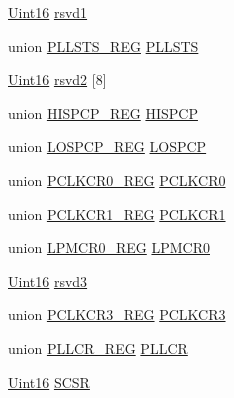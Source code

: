 \begin{DoxyCompactItemize}
\item 
\hyperlink{_d_s_p2833x___device_8h_a59a9f6be4562c327cbfb4f7e8e18f08b}{Uint16} \hyperlink{struct_s_y_s___c_t_r_l___r_e_g_s_a92fe15d379e0656fa835523dbca62358}{rsvd1}
\item 
union \hyperlink{union_p_l_l_s_t_s___r_e_g}{P\+L\+L\+S\+T\+S\+\_\+\+R\+E\+G} \hyperlink{struct_s_y_s___c_t_r_l___r_e_g_s_a13b1bddad30d3266f4160bc1fd0de68a}{P\+L\+L\+S\+T\+S}
\item 
\hyperlink{_d_s_p2833x___device_8h_a59a9f6be4562c327cbfb4f7e8e18f08b}{Uint16} \hyperlink{struct_s_y_s___c_t_r_l___r_e_g_s_aa20216c5f26c9dc412222a9b274747c0}{rsvd2} \mbox{[}8\mbox{]}
\item 
union \hyperlink{union_h_i_s_p_c_p___r_e_g}{H\+I\+S\+P\+C\+P\+\_\+\+R\+E\+G} \hyperlink{struct_s_y_s___c_t_r_l___r_e_g_s_ad42d708dd4d801d6e2d4e500f40203c1}{H\+I\+S\+P\+C\+P}
\item 
union \hyperlink{union_l_o_s_p_c_p___r_e_g}{L\+O\+S\+P\+C\+P\+\_\+\+R\+E\+G} \hyperlink{struct_s_y_s___c_t_r_l___r_e_g_s_a47d376515ad8d8ea6ca56e9a01f967ba}{L\+O\+S\+P\+C\+P}
\item 
union \hyperlink{union_p_c_l_k_c_r0___r_e_g}{P\+C\+L\+K\+C\+R0\+\_\+\+R\+E\+G} \hyperlink{struct_s_y_s___c_t_r_l___r_e_g_s_acd238c6558115a6f6bc9ba60bb2b8048}{P\+C\+L\+K\+C\+R0}
\item 
union \hyperlink{union_p_c_l_k_c_r1___r_e_g}{P\+C\+L\+K\+C\+R1\+\_\+\+R\+E\+G} \hyperlink{struct_s_y_s___c_t_r_l___r_e_g_s_ad4114eb042095b43d1aa33c19edcdd5b}{P\+C\+L\+K\+C\+R1}
\item 
union \hyperlink{union_l_p_m_c_r0___r_e_g}{L\+P\+M\+C\+R0\+\_\+\+R\+E\+G} \hyperlink{struct_s_y_s___c_t_r_l___r_e_g_s_ae03e71e7962023480bf29bb486a2f290}{L\+P\+M\+C\+R0}
\item 
\hyperlink{_d_s_p2833x___device_8h_a59a9f6be4562c327cbfb4f7e8e18f08b}{Uint16} \hyperlink{struct_s_y_s___c_t_r_l___r_e_g_s_a9790be6d3c12cb7a30e5a982b7d8635b}{rsvd3}
\item 
union \hyperlink{union_p_c_l_k_c_r3___r_e_g}{P\+C\+L\+K\+C\+R3\+\_\+\+R\+E\+G} \hyperlink{struct_s_y_s___c_t_r_l___r_e_g_s_a8ff46de9dde77535c5975ceb732b794a}{P\+C\+L\+K\+C\+R3}
\item 
union \hyperlink{union_p_l_l_c_r___r_e_g}{P\+L\+L\+C\+R\+\_\+\+R\+E\+G} \hyperlink{struct_s_y_s___c_t_r_l___r_e_g_s_a8025cf3655933b18ac398fc1f7aac8ac}{P\+L\+L\+C\+R}
\item 
\hyperlink{_d_s_p2833x___device_8h_a59a9f6be4562c327cbfb4f7e8e18f08b}{Uint16} \hyperlink{struct_s_y_s___c_t_r_l___r_e_g_s_ae6000479e34b786d1bc87c6f2e42049d}{S\+C\+S\+R}

\end{DoxyCompactItemize}
